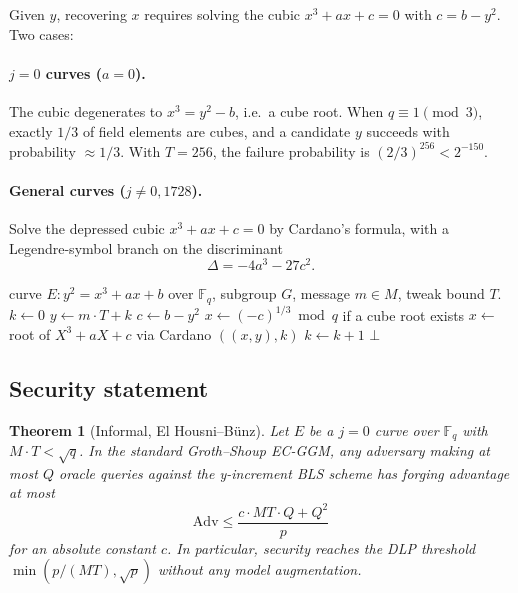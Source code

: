 \documentclass[11pt,a4paper]{article}
\newtheorem{theorem}{Theorem}
\theoremstyle{definition}
\newcommand{\F}{\mathbb{F}}
\begin{document}
Given $y$, recovering $x$ requires solving the cubic $x^3 + a x + c = 0$
with $c = b - y^2$. Two cases:

\paragraph{$j = 0$ curves ($a = 0$).}
The cubic degenerates to $x^3 = y^2 - b$, i.e.\ a cube root. When
$q \equiv 1 \pmod 3$, exactly $1/3$ of field elements are cubes, and a
candidate $y$ succeeds with probability $\approx 1/3$. With $T = 256$, the
failure probability is $(2/3)^{256} < 2^{-150}$.

\paragraph{General curves ($j \ne 0, 1728$).}
Solve the depressed cubic $x^3 + ax + c = 0$ by Cardano's formula, with a
Legendre-symbol branch on the discriminant
\[
  \Delta = -4a^3 - 27 c^2.
\]

\begin{algorithm}[H]
\caption{y-Increment Constructor (uniform over $j=0$ and $j \ne 0$)}
\label{alg:y-inc-construct}
\begin{algorithmic}[1]
\Require curve $E : y^2 = x^3 + a x + b$ over $\F_q$, subgroup $G$,
message $m \in M$, tweak bound $T$.
\State $k \gets 0$
  \State $y \gets m \cdot T + k$
  \State $c \gets b - y^2$
     \State $x \gets (-c)^{1/3} \bmod q$ if a cube root exists
  \Else
     \State $x \gets $ root of $X^3 + aX + c$ via Cardano
  \EndIf
     \State \Return $((x,y), k)$
  \EndIf
  \State $k \gets k+1$
\EndWhile
\State \Return $\bot$
\end{algorithmic}
\end{algorithm}

\subsection{Security statement}

\begin{theorem}[Informal, El Housni--Bünz]
\label{thm:y-sec}
Let $E$ be a $j=0$ curve over $\F_q$ with $M \cdot T < \sqrt q$. In the
standard Groth–Shoup EC-GGM, any adversary making at most $Q$ oracle queries
against the y-increment BLS scheme has forging advantage at most
\[
  \mathrm{Adv} \le \frac{c \cdot M T \cdot Q + Q^2}{p}
\]
for an absolute constant $c$. In particular, security reaches the DLP
threshold $\min(p/(MT), \sqrt p)$ \emph{without} any model augmentation.
\end{theorem}
\end{document}
